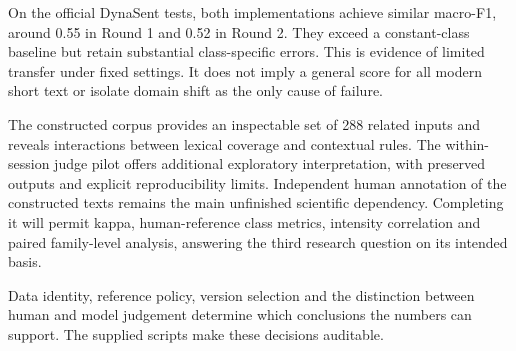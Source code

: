 \documentclass[11pt]{article}
\begin{document}
On the official DynaSent tests, both implementations achieve similar macro-F1,
around 0.55 in Round 1 and 0.52 in Round 2. They exceed a constant-class baseline
but retain substantial class-specific errors. This is evidence of limited
transfer under fixed settings. It does not imply a general score for all modern
short text or isolate domain shift as the only cause of failure.

The constructed corpus provides an inspectable set of 288 related inputs and
reveals interactions between lexical coverage and contextual rules. The
within-session judge pilot offers additional exploratory interpretation, with
preserved outputs and explicit reproducibility limits. Independent human
annotation of the constructed texts remains the main unfinished scientific
dependency. Completing it will permit kappa, human-reference class metrics,
intensity correlation and paired family-level analysis, answering the third
research question on its intended basis.

Data identity, reference policy, version selection and the distinction between
human and model judgement determine which conclusions the numbers can support.
The supplied scripts make these decisions auditable.

\clearpage
\balance

\end{document}
